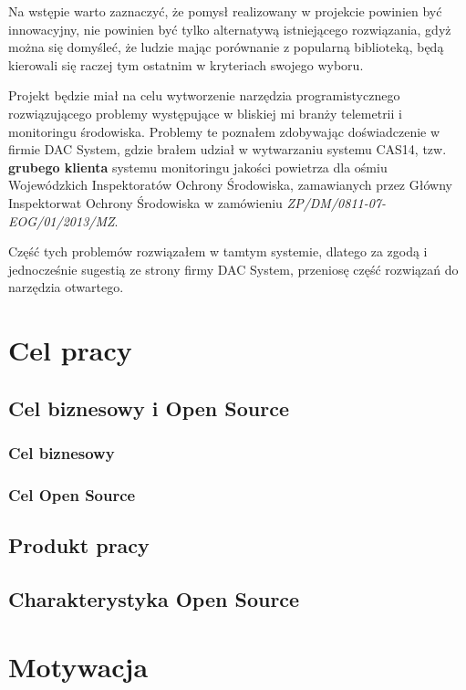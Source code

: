 Na wstępie warto zaznaczyć, że pomysł realizowany w projekcie powinien być innowacyjny, nie powinien być tylko alternatywą istniejącego rozwiązania, gdyż można się domyśleć, że ludzie mając porównanie z popularną biblioteką, będą kierowali się raczej tym ostatnim w kryteriach swojego wyboru.

Projekt będzie miał na celu wytworzenie narzędzia programistycznego rozwiązującego problemy występujące w bliskiej mi branży telemetrii i monitoringu środowiska. Problemy te poznałem zdobywając doświadczenie w firmie DAC System, gdzie brałem udział w wytwarzaniu systemu CAS14, tzw. \textbf{grubego klienta} systemu monitoringu jakości powietrza dla ośmiu Wojewódzkich Inspektoratów Ochrony Środowiska, zamawianych przez Główny Inspektorwat Ochrony Środowiska w zamówieniu \textsl{ZP/DM/0811-07-EOG/01/2013/MZ}.

Część tych problemów rozwiązałem w tamtym systemie, dlatego za zgodą i jednocześnie sugestią ze strony firmy DAC System, przeniosę część rozwiązań do narzędzia otwartego.




\section{Cel pracy}

\subsection{Cel biznesowy i Open Source}

\subsubsection*{Cel biznesowy}

\subsubsection*{Cel Open Source}


\subsection{Produkt pracy}

\subsection{Charakterystyka Open Source}

\section{Motywacja}

